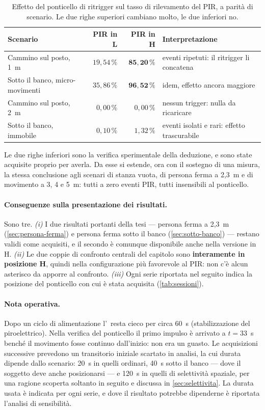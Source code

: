\begin{table}[htbp]
\centering
\caption{Effetto del ponticello di ritrigger sul tasso di rilevamento del PIR, a
parità di scenario. Le due righe superiori cambiano molto, le due inferiori no.}
\label{tab:jumper}
\small
\begin{tabularx}{\linewidth}{@{}lrrX@{}}
\toprule
\textbf{Scenario} & \textbf{PIR in L} & \textbf{PIR in H} & \textbf{Interpretazione} \\
\midrule
Cammino sul posto, 1~m & $19{,}54\,\%$ & $\mathbf{85{,}20\,\%}$ &
  eventi ripetuti: il ritrigger li concatena \\
Sotto il banco, micro-movimenti & $35{,}86\,\%$ & $\mathbf{96{,}52\,\%}$ &
  idem, effetto ancora maggiore \\
Cammino sul posto, 2~m & $0{,}00\,\%$ & $0{,}00\,\%$ &
  nessun trigger: nulla da ricaricare \\
Sotto il banco, immobile & $0{,}10\,\%$ & $1{,}32\,\%$ &
  eventi isolati e rari: effetto trascurabile \\
\bottomrule
\end{tabularx}
\end{table}

Le due righe inferiori sono la verifica sperimentale della deduzione, e sono state
acquisite proprio per averla. Da esse si estende, ora con il sostegno di una misura,
la stessa conclusione agli scenari di stanza vuota, di persona ferma a 2,3~m e di
movimento a 3, 4 e 5~m: tutti a zero eventi PIR, tutti insensibili al ponticello.

\paragraph{Conseguenze sulla presentazione dei risultati.} Sono tre.
\emph{(i)} I due risultati portanti della tesi --- persona ferma a 2,3~m
(\cref{sec:persona-ferma}) e persona ferma sotto il banco (\cref{sec:sotto-banco})
--- restano validi come acquisiti, e il secondo è comunque disponibile anche nella
versione in H. \emph{(ii)} Le due coppie di confronto centrali del capitolo sono
\textbf{interamente in posizione H}, quindi nella configurazione più favorevole al
PIR: non c'è alcun asterisco da apporre al confronto. \emph{(iii)} Ogni serie
riportata nel seguito indica la posizione del ponticello con cui è stata acquisita
(\cref{tab:sessioni}).

\paragraph{Nota operativa.} Dopo un ciclo di alimentazione l'\pir\ resta cieco per
circa 60~s (stabilizzazione del piroelettrico). Nella verifica del ponticello il
primo impulso è arrivato a $t = 33$~s benché il movimento fosse continuo dall'inizio:
non era un guasto. Le acquisizioni successive prevedono un transitorio iniziale
scartato in analisi, la cui durata dipende dallo scenario: 20~s in quelli ordinari,
40~s sotto il banco --- dove il soggetto deve anche posizionarsi --- e 120~s in quelli
di selettività spaziale, per una ragione scoperta soltanto in seguito e discussa in
\cref{sec:selettivita}. La durata usata è indicata per ogni serie, e dove il risultato
potrebbe dipenderne è riportata l'analisi di sensibilità.

